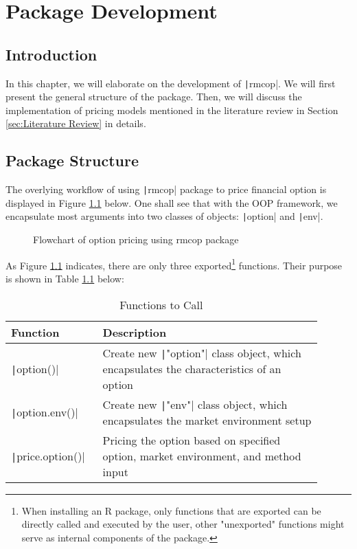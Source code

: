\chapter{Package Development} \label{cpt:Pkg Dev}

\section{Introduction}

In this chapter, we will elaborate on the development of \texttt|rmcop|. We will first present the general structure of the package. Then, we will discuss the implementation of pricing models mentioned in the literature review in Section \ref{sec:Literature Review} in details.

\section{Package Structure} \label{sec:Pkg Structure}

The overlying workflow of using \texttt|rmcop| package to price financial option is displayed in Figure \ref{img:flowchart_option} below. One shall see that with the OOP framework, we encapsulate most arguments into two classes of objects: \texttt|option| and \texttt|env|.

\begin{figure}[H]
    \centering
    
    \caption{Flowchart of option pricing using rmcop package} \label{img:flowchart_option}
\end{figure}

As Figure \ref{img:flowchart_option} indicates, there are only three exported\footnote{When installing an R package, only functions that are exported can be directly called and executed by the user, other "unexported" functions might serve as internal components of the package.} functions. Their purpose is shown in Table \ref{tab:pkg_functions} below:

\begin{table}[H]
    \begin{tabular}{p{0.25\linewidth} | p{0.65\linewidth}}
    Function                            & Description \\ \hline
    \texttt|option()|            & Create new \texttt|"option"| class object, which encapsulates the characteristics of an option \\
    \texttt|option.env()|        & Create new \texttt|"env"| class object, which encapsulates the market environment setup \\
    \texttt|price.option()|      & Pricing the option based on specified option, market environment, and method input                       
    \end{tabular}
    \caption{Functions to Call} \label{tab:pkg_functions}
\end{table}
    


